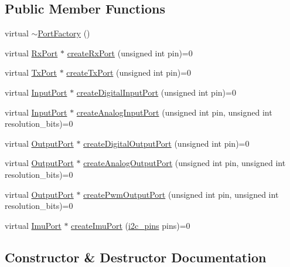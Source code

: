 \subsection*{Public Member Functions}
\begin{DoxyCompactItemize}
\item 
virtual \hyperlink{classPortFactory_a3bbb656dccb31447dd329a35475e8595}{$\sim$\+Port\+Factory} ()
\item 
virtual \hyperlink{classRxPort}{Rx\+Port} $\ast$ \hyperlink{classPortFactory_a1def158625545313ffcd00c32b04ac2e}{create\+Rx\+Port} (unsigned int pin)=0
\item 
virtual \hyperlink{classTxPort}{Tx\+Port} $\ast$ \hyperlink{classPortFactory_ae174bc69771d208ca6c6689ae9b3e441}{create\+Tx\+Port} (unsigned int pin)=0
\item 
virtual \hyperlink{classInputPort}{Input\+Port} $\ast$ \hyperlink{classPortFactory_a37f32cc4314eb9bd432a46565de10aea}{create\+Digital\+Input\+Port} (unsigned int pin)=0
\item 
virtual \hyperlink{classInputPort}{Input\+Port} $\ast$ \hyperlink{classPortFactory_a3b005a67c687bfbfd94a159fb3622ea8}{create\+Analog\+Input\+Port} (unsigned int pin, unsigned int resolution\+\_\+bits)=0
\item 
virtual \hyperlink{classOutputPort}{Output\+Port} $\ast$ \hyperlink{classPortFactory_ac4fd7d24cc61b5972c9269ea2de23775}{create\+Digital\+Output\+Port} (unsigned int pin)=0
\item 
virtual \hyperlink{classOutputPort}{Output\+Port} $\ast$ \hyperlink{classPortFactory_a325dcb9bf70e873129a946959544a6c8}{create\+Analog\+Output\+Port} (unsigned int pin, unsigned int resolution\+\_\+bits)=0
\item 
virtual \hyperlink{classOutputPort}{Output\+Port} $\ast$ \hyperlink{classPortFactory_a21257b8f99f2088cefd0a8f63cbecb45}{create\+Pwm\+Output\+Port} (unsigned int pin, unsigned int resolution\+\_\+bits)=0
\item 
virtual \hyperlink{classImuPort}{Imu\+Port} $\ast$ \hyperlink{classPortFactory_a8cd7f7ca5cbee77e9fcac3050f86f6ba}{create\+Imu\+Port} (\hyperlink{Arduino_8hpp_aaa5bce2cb83fc43fec67214bf4feea69}{i2c\+\_\+pins} pins)=0
\end{DoxyCompactItemize}


\subsection{Constructor \& Destructor Documentation}
